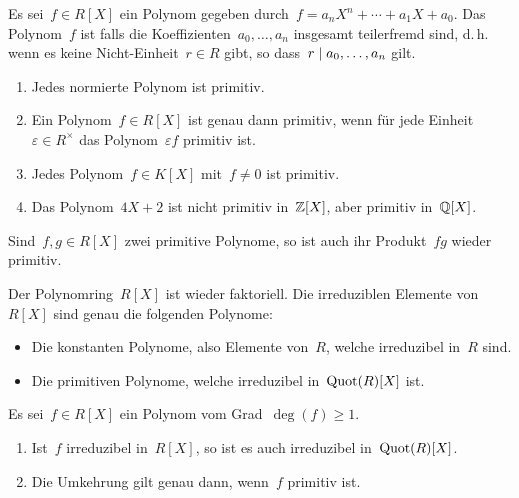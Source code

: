 \begin{definition}
  Es sei~$f \in R[X]$ ein Polynom gegeben durch~$f = a_n X^n + \dotsb + a_1 X + a_0$.
  Das Polynom~$f$ ist  falls die Koeffizienten~$a_0, \dotsc, a_n$ insgesamt teilerfremd sind, d.\,h. wenn es keine Nicht-Einheit~$r \in R$ gibt, so dass~$r \mid a_0, \dotsc, a_n$ gilt.
\end{definition}

\begin{example}
  \leavevmode
  \begin{enumerate}
    \item
      Jedes normierte Polynom ist primitiv.
    \item
      Ein Polynom~$f \in R[X]$ ist genau dann primitiv, wenn für jede Einheit~$\varepsilon \in R^\times$ das Polynom~$\varepsilon f$ primitiv ist.
    \item
      Jedes Polynom~$f \in K[X]$ mit~$f \neq 0$ ist primitiv.
    \item
      Das Polynom~$4X + 2$ ist nicht primitiv in~$\mathbb{Z}[X]$, aber primitiv in~$\mathbb{Q}[X]$.
  \end{enumerate}
\end{example}

\begin{proposition}
  Sind~$f, g \in R[X]$ zwei primitive Polynome, so ist auch ihr Produkt~$fg$ wieder primitiv.
\end{proposition}

\begin{theorem}
  Der Polynomring~$R[X]$ ist wieder faktoriell.
  Die irreduziblen Elemente von~$R[X]$ sind genau die folgenden Polynome:
  \begin{itemize}
    \item
      Die konstanten Polynome, also Elemente von~$R$, welche irreduzibel in~$R$ sind.
    \item
      Die primitiven Polynome, welche irreduzibel in~$\operatorname{Quot}(R)[X]$ ist.
  \end{itemize}
\end{theorem}

\begin{corollary}
  Es sei~$f \in R[X]$ ein Polynom vom Grad~$\deg(f) \geq 1$.
  \begin{enumerate}
    \item
      Ist~$f$ irreduzibel in~$R[X]$, so ist es auch irreduzibel in~$\operatorname{Quot}(R)[X]$.
    \item
      Die Umkehrung gilt genau dann, wenn~$f$ primitiv ist.
  \end{enumerate}
\end{corollary}

